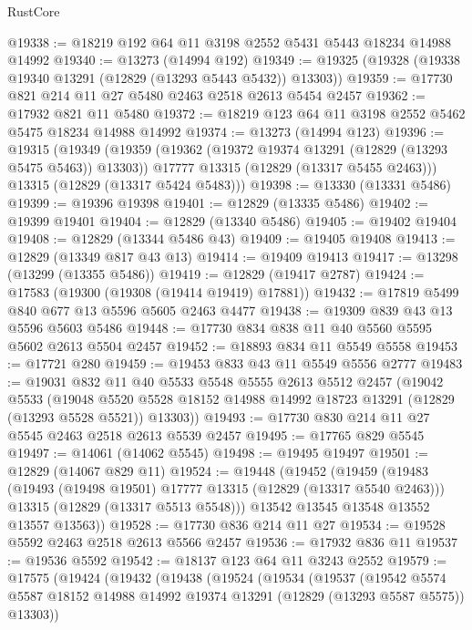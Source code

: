 \begin{lexlean}{RustCore}
\begin{coremodule}
@19338 := @18219 @192 @64 @11 @3198 @2552 @5431 @5443 @18234 @14988 @14992
@19340 := @13273 (@14994 @192)
@19349 := @19325 (@19328 (@19338 @19340 @13291 (@12829 (@13293 @5443 @5432)) @13303))
@19359 := @17730 @821 @214 @11 @27 @5480 @2463 @2518 @2613 @5454 @2457
@19362 := @17932 @821 @11 @5480
@19372 := @18219 @123 @64 @11 @3198 @2552 @5462 @5475 @18234 @14988 @14992
@19374 := @13273 (@14994 @123)
@19396 := @19315
    (@19349
      (@19359
        (@19362 (@19372 @19374 @13291 (@12829 (@13293 @5475 @5463)) @13303))
        @17777
        @13315
        (@12829 (@13317 @5455 @2463)))
      @13315
      (@12829 (@13317 @5424 @5483)))
@19398 := @13330 (@13331 @5486)
@19399 := @19396 @19398
@19401 := @12829 (@13335 @5486)
@19402 := @19399 @19401
@19404 := @12829 (@13340 @5486)
@19405 := @19402 @19404
@19408 := @12829 (@13344 @5486 @43)
@19409 := @19405 @19408
@19413 := @12829 (@13349 @817 @43 @13)
@19414 := @19409 @19413
@19417 := @13298 (@13299 (@13355 @5486))
@19419 := @12829 (@19417 @2787)
@19424 := @17583 (@19300 (@19308 (@19414 @19419) @17881))
@19432 := @17819 @5499 @840 @677 @13 @5596 @5605 @2463 @4477
@19438 := @19309 @839 @43 @13 @5596 @5603 @5486
@19448 := @17730 @834 @838 @11 @40 @5560 @5595 @5602 @2613 @5504 @2457
@19452 := @18893 @834 @11 @5549 @5558
@19453 := @17721 @280
@19459 := @19453 @833 @43 @11 @5549 @5556 @2777
@19483 := @19031
    @832
    @11
    @40
    @5533
    @5548
    @5555
    @2613
    @5512
    @2457
    (@19042
      @5533
      (@19048 @5520 @5528 @18152 @14988 @14992 @18723 @13291 (@12829 (@13293 @5528 @5521)) @13303))
@19493 := @17730 @830 @214 @11 @27 @5545 @2463 @2518 @2613 @5539 @2457
@19495 := @17765 @829 @5545
@19497 := @14061 (@14062 @5545)
@19498 := @19495 @19497
@19501 := @12829 (@14067 @829 @11)
@19524 := @19448
    (@19452
      (@19459
        (@19483
          (@19493 (@19498 @19501) @17777 @13315 (@12829 (@13317 @5540 @2463)))
          @13315
          (@12829 (@13317 @5513 @5548)))
        @13542
        @13545
        @13548
        @13552
        @13557
        @13563))
@19528 := @17730 @836 @214 @11 @27
@19534 := @19528 @5592 @2463 @2518 @2613 @5566 @2457
@19536 := @17932 @836 @11
@19537 := @19536 @5592
@19542 := @18137 @123 @64 @11 @3243 @2552
@19579 := @17575
    (@19424
      (@19432
        (@19438
          (@19524
            (@19534
              (@19537
                (@19542
                  @5574
                  @5587
                  @18152
                  @14988
                  @14992
                  @19374
                  @13291
                  (@12829 (@13293 @5587 @5575))
                  @13303))

\end{coremodule}
\end{lexlean}
